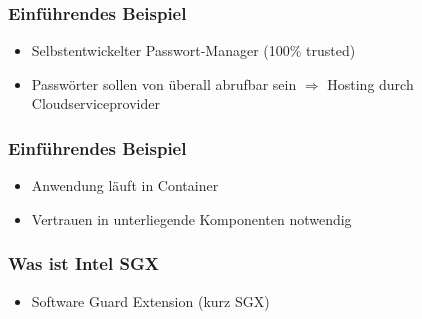 \begin{frame}
    \frametitle{Einführendes Beispiel}
    \begin{itemize}
        \item Selbstentwickelter Passwort-Manager (100\% trusted)
        \item Passwörter sollen von überall abrufbar sein $\Rightarrow$ Hosting durch Cloudserviceprovider
    \end{itemize}
    \centering
\end{frame}

\begin{frame}
    \frametitle{Einführendes Beispiel}
    \begin{itemize}
        \item Anwendung läuft in Container
        \item Vertrauen in unterliegende Komponenten notwendig
    \end{itemize}
    \centering
\end{frame}

\begin{frame}
    \frametitle{Was ist Intel SGX}
    \begin{itemize}
        \item Software Guard Extension (kurz SGX)
    \end{itemize}
\end{frame}